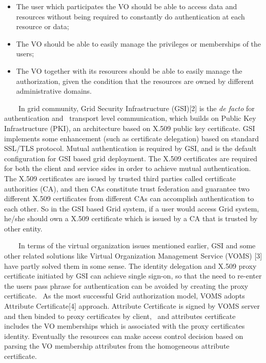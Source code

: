 \documentclass{article}
\newcommand\liststyleLii{%
\renewcommand\labelitemi{${\bullet}$}
\renewcommand\labelitemii{${\circ}$}
\renewcommand\labelitemiii{${\blacksquare}$}
\renewcommand\labelitemiv{${\bullet}$}
}
\begin{document}
\liststyleLii
\begin{itemize}
\item The user which participates the VO should be able to access data
and resources without being required to constantly do authentication at
each resource or data; 
\item The VO should be able to easily manage the privileges or
memberships of the users; 
\item The VO together with its resources should be able to easily manage
the authorization, given the condition that the resources are owned by
different administrative domains.
\end{itemize}
\ \ \ \ In grid community, Grid Security Infrastructure (GSI)[2] is the
\textit{de facto} for authentication and \ transport level
communication, which builds on Public Key Infrastructure (PKI), an
architecture based on X.509 public key certificate. GSI implements some
enhancement (such as certificate delegation) based on standard SSL/TLS
protocol. Mutual authentication is required by GSI, and is the default
configuration for GSI based grid deployment. The X.509 certificates are
required for both the client and service sides in order to achieve
mutual authentication. The X.509 certificates are issued by trusted
third parties called certificate authorities (CA), and then CAs
constitute trust federation and guarantee two different X.509
certificates from different CAs can accomplish authentication to each
other. So in the GSI based Grid system, if a user would access Grid
system, he/she should own a X.509 certificate which is issued by a CA
that is trusted by other entity.

\ \ \ \ In terms of the virtual organization issues mentioned earlier,
GSI and some other related solutions like Virtual Organization
Management Service (VOMS) [3] have partly solved them in some sense.
The identity delegation and X.509 proxy certificate initiated by GSI
can achieve single sign-on, so that the need to re-enter the
user{\textquotesingle}s pass phrase for authentication can be avoided
by creating the proxy certificate. \ As the most successful Grid
authorization model, VOMS adopts Attribute Certificate[4] approach.
Attribute Certificate is signed by VOMS server and then binded to proxy
certificates by client, \ and attributes certificate includes the VO
memberships which is associated with the proxy
certificate{\textquotesingle}s identity. Eventually the resources can
make access control decision based on parsing the VO membership
attributes from the homogeneous attribute certificate. 
\end{document}
